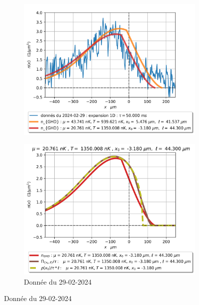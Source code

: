 \documentclass[submission, Phys]{SciPost}
\begin{document}
\begin{figure}[ht]
\begin{subfigure}[b]{0.24\textwidth}
        		\label{fig:simul_deformation}
   			\end{subfigure}
    		\hfill
    		\begin{subfigure}[b]{0.24\textwidth}
        		\centering
        		\includegraphics[width=\textwidth]{Figures/article_simul_expansion_1_29-02-2024}
        		\caption{}
        		\label{fig:simul_expansion}
    		\end{subfigure}
    		\hfill
    		\begin{subfigure}[b]{0.24\textwidth}
    			\centering
				\includegraphics[width=\textwidth]{Figures/article_distribution_29-02-2024}		
				\caption{Donnée du 29-02-2024}
   				\label{}    			
    		\end{subfigure}    		
    		\caption{Donnée du 29-02-2024}
   			\label{}					
		\end{figure}
		
\end{document}
